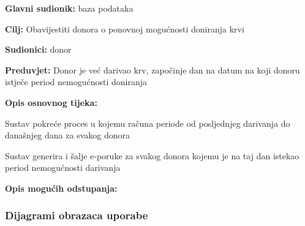 					
					\noindent {}
					\begin{packed_item}
	
						\item \textbf{Glavni sudionik: }baza podataka
						\item  \textbf{Cilj:} Obavijestiti donora o ponovnoj mogućnosti doniranja krvi
						\item  \textbf{Sudionici:} donor
						\item  \textbf{Preduvjet:} Donor je već darivao krv, započinje dan na datum na koji donoru istječe period nemogućnosti doniranja
						\item  \textbf{Opis osnovnog tijeka:}
						
						\item[] \begin{packed_enum}
							\item Sustav pokreće proces u kojemu računa periode od posljednjeg darivanja do današnjeg dana za svakog donora
	                        \item Sustav generira i šalje e-poruke za svakog donora kojemu je na taj dan istekao period nemogućnosti darivanja
						\end{packed_enum}
						
						\item  \textbf{Opis mogućih odstupanja:}
						
					\end{packed_item}
					
				\subsubsection{Dijagrami obrazaca uporabe}
					
				
